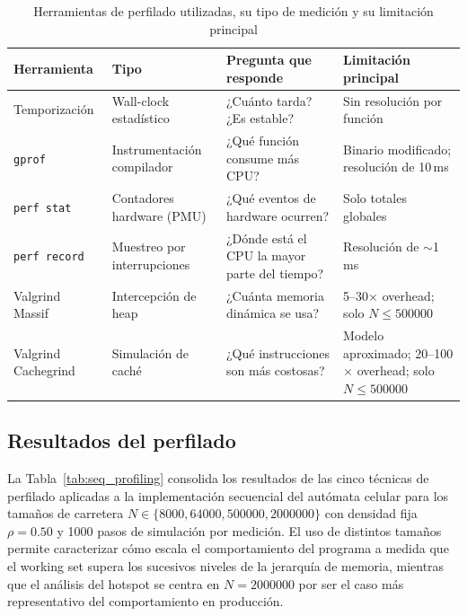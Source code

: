 \begin{table}[H]
\centering
\caption{Herramientas de perfilado utilizadas, su tipo de medición y su limitación principal}
\label{tab:profiling_tools}
\begin{tabular}{p{2.8cm}p{3.0cm}p{4.5cm}p{3.5cm}}
\toprule
\textbf{Herramienta} & \textbf{Tipo} & \textbf{Pregunta que responde} & \textbf{Limitación principal} \\
\midrule
Temporización    & Wall-clock estadístico     & ¿Cuánto tarda? ¿Es estable?                          & Sin resolución por función \\
\texttt{gprof}   & Instrumentación compilador & ¿Qué función consume más CPU?                        & Binario modificado; resolución de 10\,ms \\
\texttt{perf stat}   & Contadores hardware (PMU)  & ¿Qué eventos de hardware ocurren?                    & Solo totales globales \\
\texttt{perf record} & Muestreo por interrupciones & ¿Dónde está el CPU la mayor parte del tiempo?       & Resolución de $\sim$1\,ms \\
Valgrind Massif  & Intercepción de heap       & ¿Cuánta memoria dinámica se usa?                     & 5--30$\times$ overhead; solo $N \leq 500000$ \\
Valgrind Cachegrind & Simulación de caché     & ¿Qué instrucciones son más costosas?                 & Modelo aproximado; 20--100$\times$ overhead; solo $N \leq 500000$ \\
\bottomrule
\end{tabular}
\end{table}

\subsection{Resultados del perfilado}
\label{sec:resultados_perfilado}

La Tabla~\ref{tab:seq_profiling} consolida los resultados de las cinco técnicas de
perfilado aplicadas a la implementación secuencial del autómata celular para los
tamaños de carretera \newline $N \in \{8000, 64000, 500000, 2000000\}$ con densidad fija
$\rho = 0.50$ y 1000 pasos de simulación por medición.
El uso de distintos tamaños permite caracterizar cómo escala el comportamiento del
programa a medida que el working set supera los sucesivos niveles de la jerarquía
de memoria, mientras que el análisis del hotspot se centra en $N = 2000000$ por ser
el caso más representativo del comportamiento en producción.

